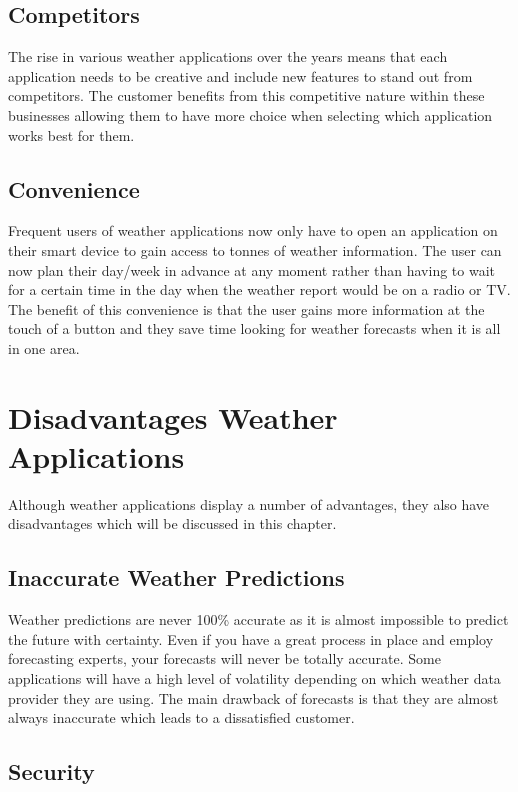 \subsection{Competitors}

The rise in various weather applications over the years means that each application needs to be creative and include new features to stand out from competitors. The customer benefits from this competitive nature within these businesses allowing them to have more choice when selecting which application works best for them. 
\subsection{Convenience}
Frequent users of weather applications now only have to open an application on their smart device to gain access to tonnes of weather information. The user can now plan their day/week in advance at any moment rather than having to wait for a certain time in the day when the weather report would be on a radio or TV. The benefit of this convenience is that the user gains more information at the touch of a button and they save time looking for weather forecasts when it is all in one area.

\section{Disadvantages Weather Applications}
Although weather applications display a number of advantages, they also have disadvantages which will be discussed in this chapter.

\subsection{Inaccurate Weather Predictions}

Weather predictions are never 100\% accurate as it is almost impossible to predict the future with certainty. Even if you have a great process in place and employ forecasting experts, your forecasts will never be totally accurate. Some applications will have a high level of volatility depending on which weather data provider they are using. The main drawback of forecasts is that they are almost always inaccurate which leads to a dissatisfied customer.

\subsection{Security}

